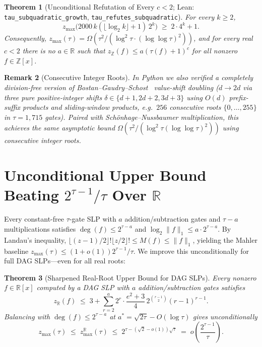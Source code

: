 \documentclass[11pt]{article}
\newtheorem{theorem}{Theorem}[section]
\newtheorem{remark}[theorem]{Remark}
\newcommand{\Z}{\mathbb{Z}}
\newcommand{\R}{\mathbb{R}}
\newcommand{\code}[1]{\texttt{#1}}
\newcommand{\zmax}{z_{\max}}
\newcommand{\zZ}{z_{\Z}}
\begin{document}
\begin{theorem}[Unconditional Refutation of Every $c < 2$; Lean: \code{tau\_subquadratic\_growth}, \code{tau\_refutes\_subquadratic}]\label{thm:subquad}
For every $k \ge 2$,
\[
  \zmax\bigl(2000\, k(\lfloor \log_2 k \rfloor + 1)\, 2^k\bigr) \;\ge\; 2 \cdot 4^k + 1.
\]
Consequently, $\zmax(\tau) = \Omega\!\left(\tau^2 / (\log^2 \tau \cdot (\log\log \tau)^2)\right)$, and for every real $c < 2$ there is no $a \in \R$ such that $\zZ(f) \le a(\tau(f) + 1)^c$ for all nonzero $f \in \Z[x]$.
\end{theorem}

\begin{remark}[Consecutive Integer Roots]
In Python we also verified a completely division-free version of Bostan--Gaudry--Schost~\cite{BGS2007} value-shift doubling ($d \to 2d$ via three pure positive-integer shifts $\delta \in \{d+1, 2d+2, 3d+3\}$ using $O(d)$ prefix-suffix products and sliding-window products, e.g.\ $256$ consecutive roots $\{0, \dots, 255\}$ in $\tau = 1{,}715$ gates). Paired with Sch\"onhage--Nussbaumer multiplication, this achieves the same asymptotic bound $\Omega(\tau^2 / (\log^2\tau (\log\log\tau)^2))$ using consecutive integer roots.
\end{remark}

\section{Unconditional Upper Bound Beating $2^{\tau - 1}/\tau$ Over $\R$}\label{sec:upper}

Every constant-free $\tau$-gate SLP with $a$ addition/subtraction gates and $\tau - a$ multiplications satisfies $\deg(f) \le 2^{\tau - a}$ and $\log_2 \|f\|_1 \le a \cdot 2^{\tau - a}$. By Landau's inequality, $\lfloor (z-1)/2 \rfloor!\lfloor z/2 \rfloor! \le M(f) \le \|f\|_1$, yielding the Mahler baseline $\zmax(\tau) \le (1 + o(1)) 2^{\tau-1}/\tau$. We improve this unconditionally for full DAG SLPs---even for all real roots:

\begin{theorem}[Sharpened Real-Root Upper Bound for DAG SLPs]\label{thm:bs}
Every nonzero $f \in \R[x]$ computed by a DAG SLP with $a$ addition/subtraction gates satisfies
\[
  z_{\R}(f) \;\le\; 3 + \sum_{r=2}^a 2^r \cdot \frac{e^2 + 3}{4}\, 2^{\binom{r-1}{2}} (r - 1)^{r-1}.
\]
Balancing with $\deg(f) \le 2^{\tau - a}$ at $a^* = \sqrt{2\tau} - O(\log \tau)$ gives unconditionally
\[
  \zmax(\tau) \;\le\; \zmax^{\R}(\tau) \;\le\; 2^{\tau - (\sqrt{2} - o(1))\sqrt{\tau}} \;=\; o\!\left(\frac{2^{\tau-1}}{\tau}\right).
\]
\end{theorem}
\end{document}
